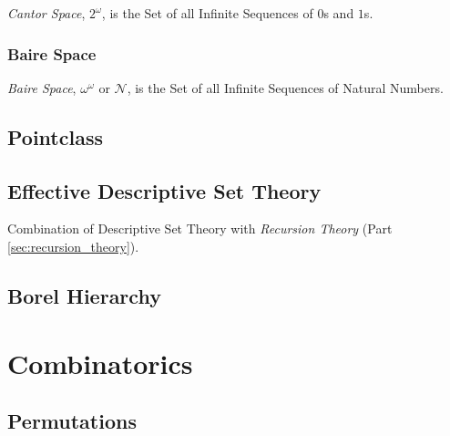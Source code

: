 \emph{Cantor Space}, $2^{\omega}$, is the Set of all Infinite
Sequences of $0$s and $1$s.



\subsubsection{Baire Space}

\emph{Baire Space}, $\omega^{\omega}$ or $\mathcal{N}$, is the Set of
all Infinite Sequences of Natural Numbers.



\subsection{Pointclass}\label{sec:pointclass}

\subsection{Effective Descriptive Set Theory}

Combination of Descriptive Set Theory with \emph{Recursion Theory}
(Part \ref{sec:recursion_theory}).

\subsection{Borel Hierarchy}\label{sec:borel_hierarchy}



\section{Combinatorics}

\subsection{Permutations}\label{sec:permutations}



